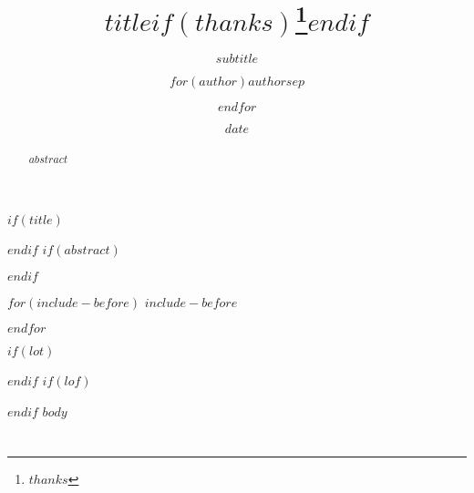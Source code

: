 \documentclass[a4paper,twoside,parskip=half]{scrbook}
\title{$title$$if(thanks)$\thanks{$thanks$}$endif$}
\subtitle{$subtitle$}
\author{$for(author)$$author$$sep$ \and $endfor$}
\institute{$for(institute)$$institute$$sep$ \and $endfor$}
\date{$date$}
\begin{document}
$if(title)$
\maketitle
$endif$
$if(abstract)$
\begin{abstract}
$abstract$
\end{abstract}
$endif$

$for(include-before)$
$include-before$

$endfor$

$if(lot)$
\listoftables
$endif$
$if(lof)$
\listoffigures
$endif$
$body$



% 




\clearpage
{}


\chapter*{}
\printindex
\end{document}

